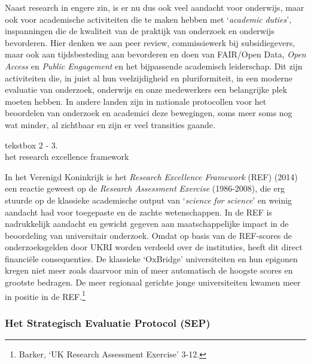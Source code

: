 \documentclass[smallauthor, chapterhaspagenum, nochapterinheader, pagenuminheader,  bigchapnum,medium2, tocpages, garamond, titleinheader]{jote-book}
\begin{document}
	Naast research in engere zin, is er nu dus ook veel aandacht voor onderwijs, maar ook voor academische activiteiten die te maken hebben met ‘\emph{academic}\emph{ }\emph{duties}', inspanningen die de kwaliteit van de praktijk van onderzoek en onderwijs bevorderen. Hier denken we aan peer review, commissiewerk bij subsidiegevers, maar ook aan tijdsbesteding aan bevorderen en doen van FAIR/Open Data, \emph{Open Access} en \emph{Public Engagement} en het bijpassende academisch leiderschap. Dit zijn activiteiten die, in juist al hun veelzijdigheid en pluriformiteit, in een moderne evaluatie van onderzoek, onderwijs en onze medewerkers een belangrijke plek moeten hebben. In andere landen zijn in nationale protocollen voor het beoordelen van onderzoek en academici deze bewegingen, soms meer soms nog wat minder, al zichtbaar en zijn er veel transities gaande.

	\begin{bookbox}{\raggedright tekstbox 2 - 3. \\het research excellence framework}
		In het Verenigd Koninkrijk is het \emph{Research Excellence Framework} (REF) (2014) een reactie geweest op de \emph{Research Assessment }\emph{Exercise} (1986-2008), die erg stuurde op de klassieke academische output van ‘\emph{science}\emph{ }\emph{for}\emph{ }\emph{science}' en weinig aandacht had voor toegepaste en de zachte wetenschappen. In de REF is nadrukkelijk aandacht en gewicht gegeven aan maatschappelijke impact in de beoordeling van universitair onderzoek. Omdat op basis van de REF-scores de onderzoeksgelden door UKRI worden verdeeld over de instituties, heeft dit direct financiële consequenties. De klassieke ‘OxBridge' universiteiten en hun epigonen kregen niet meer zoals daarvoor min of meer automatisch de hoogste scores en grootste bedragen. De meer regionaal gerichte jonge universiteiten kwamen meer in positie in de REF.\footnote{Barker, ‘UK Research Assessment Exercise' 3-12.}
	\end{bookbox}

	\subsubsection{Het Strategisch Evaluatie Protocol (SEP)}
\end{document}
